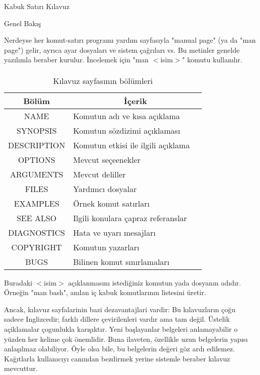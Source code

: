 \begin{section}{Kabuk Satırı Kılavuz}
\begin{subsection}{Genel Bakış}

Nerdeyse her komut-satırı programı yardım sayfasıyla "manual page" (ya da "man page") gelir, ayrıca ayar dosyaları ve sistem çağrıları vs. Bu metinler 
genelde yazılımla beraber kurulur. İncelemek için "man $<$isim$>$" komutu kullanılır.

\paragraph{}{
\begin {table}[H]
\caption {Kılavuz sayfasının bölümleri} \label{tab:title} 
\begin{tabular}{c l @{} l}
\hline
Bölüm &
\multicolumn{2}{c}{İçerik} \\
\hline
NAME 	&	Komutun adı ve kısa açıklama \\
SYNOPSIS &	Komutun sözdizimi açıklaması \\
DESCRIPTION &	Komutun etkisi ile ilgili açıklama \\
OPTIONS &	Mevcut seçeenekler \\
ARGUMENTS &	Mevcut deliller \\
FILES 	&	Yardımcı dosyalar \\
EXAMPLES &	Örnek komut satırları \\
SEE ALSO &	Ilgili konulara çapraz referanslar \\
DIAGNOSTICS &	Hata ve uyarı mesajları \\
COPYRIGHT & 	Komutun yazarları \\
BUGS	&	Bilinen komut sınırlamaları \\
\hline
\end{tabular}
\end {table}
}

Buradaki $<$isim$>$ açıklanmasını istediğiniz komutun yada dosyanın adıdır. Örneğin "man bash", anılan iç kabuk komutlarının listesini üretir.

Ancak, kılavuz sayfalarinin bazi dezavantajlari vardir: Bu kılavuzların çoğu sadece Inglizcedir; farklı dillere çevirilenleri vardır ama tam değil. Üstelik açiklamalar çogunlukla karışıktır. Yeni başlayanlar belgeleri anlamayabilir o yüzden her kelime çok önemlidir. Buna ilaveten, özellikle uzun belgelerin yapısı anlaşılmaz olabiliyor. Öyle olsa bile, bu belgelerin değeri göz ardı edilemez. Kağıtlarla kullanıcıyı canından bezdirmek yerine sistemle beraber kılavuz mevcuttur.


\end{subsection}
\end{section}
